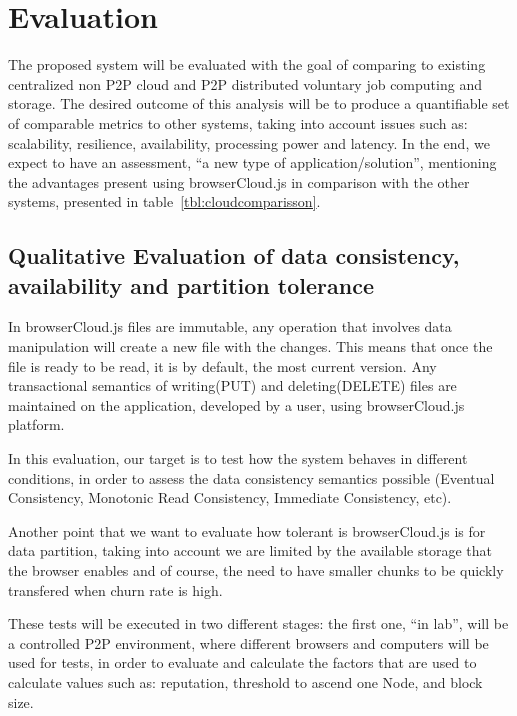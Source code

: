 
% 
% 

\section{Evaluation}

The proposed system will be evaluated with the goal of comparing to existing centralized non P2P cloud and P2P distributed voluntary job computing and storage. The desired outcome of this analysis will be to produce a quantifiable set of comparable metrics to other systems, taking into account issues such as: scalability, resilience, availability, processing power and latency. In the end, we expect to have an assessment, ``a new type of application/solution'', mentioning the advantages present using browserCloud.js in comparison with the other systems, presented in table~\ref{tbl:cloudcomparisson}.


\subsection{Qualitative Evaluation of data consistency, availability and partition tolerance}

In browserCloud.js files are immutable, any operation that involves data manipulation will create a new file with the changes. This means that once the file is ready to be read, it is by default, the most current version. Any transactional semantics of writing(PUT) and deleting(DELETE) files are maintained on the application, developed by a user, using browserCloud.js platform. 

In this evaluation, our target is to test how the system behaves in different conditions, in order to assess the data consistency semantics possible (Eventual Consistency, Monotonic Read Consistency, Immediate Consistency, etc).

Another point that we want to evaluate how tolerant is browserCloud.js is for data partition, taking into account we are limited by the available storage that the browser enables and of course, the need to have smaller chunks to be quickly transfered when churn rate is high.

These tests will be executed in two different stages: the first one, ``in lab'', will be a controlled P2P environment, where different browsers and computers will be used for tests, in order to evaluate and calculate the factors that are used to calculate values such as: reputation, threshold to ascend one Node, and block size. 

